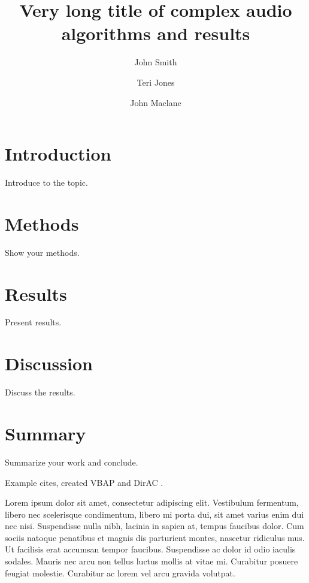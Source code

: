 \documentclass[convention]{aesconf}
\title{Very long title of complex audio algorithms and results}
\author[1]{John Smith}
\author[1,2]{Teri Jones}
\author[2]{John Maclane}
\affil[1]{First University}
\affil[2]{Second company}
\begin{document}

\section{Introduction}

Introduce to the topic.

\section{Methods}

Show your methods.

\section{Results}  

Present results.

\section{Discussion} 

Discuss the results.

\section{Summary} 

Summarize your work and conclude.

Example cites, \citet{Pulkki1997:VBAPbase} created VBAP and DirAC \citep{Pulkki2007:DirAC_JAES}.

Lorem ipsum dolor sit amet, consectetur adipiscing elit. Vestibulum fermentum, libero nec scelerisque condimentum, libero mi porta dui, sit amet varius enim dui nec nisi. Suspendisse nulla nibh, lacinia in sapien at, tempus faucibus dolor. Cum sociis natoque penatibus et magnis dis parturient montes, nascetur ridiculus mus. Ut facilisis erat accumsan tempor faucibus. Suspendisse ac dolor id odio iaculis sodales. Mauris nec arcu non tellus luctus mollis at vitae mi. Curabitur posuere feugiat molestie. Curabitur ac lorem vel arcu gravida volutpat.
\end{document}
